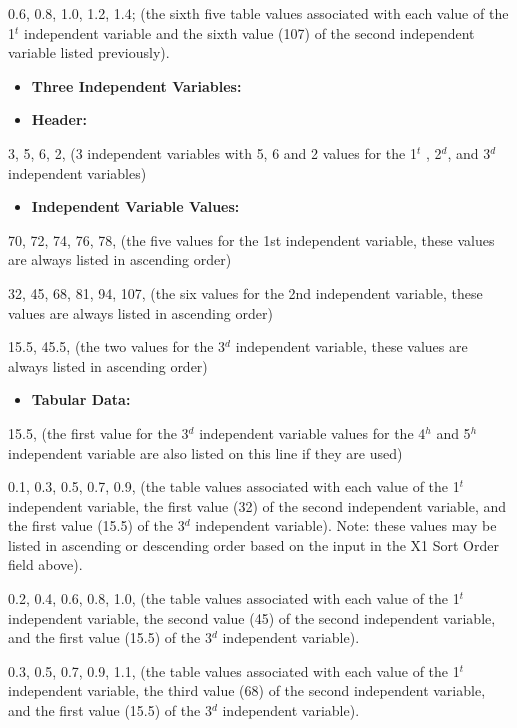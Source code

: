 0.6, 0.8, 1.0, 1.2, 1.4; (the sixth five table values associated with each value of the 1\(^{t}\) independent variable and the sixth value (107) of the second independent variable listed previously).

\begin{itemize}
\item
  \textbf{Three Independent Variables:}
\item
  \textbf{Header:}
\end{itemize}

3, 5, 6, 2, (3 independent variables with 5, 6 and 2 values for the 1\(^{t}\) , 2\(^{d}\), and 3\(^{d}\) independent variables)

\begin{itemize}
\tightlist
\item
  \textbf{Independent Variable Values:}
\end{itemize}

70, 72, 74, 76, 78, (the five values for the 1st independent variable, these values are always listed in ascending order)

32, 45, 68, 81, 94, 107, (the six values for the 2nd independent variable, these values are always listed in ascending order)

15.5, 45.5, (the two values for the 3\(^{d}\) independent variable, these values are always listed in ascending order)

\begin{itemize}
\tightlist
\item
  \textbf{Tabular Data:}
\end{itemize}

15.5, (the first value for the 3\(^{d}\) independent variable values for the 4\(^{h}\) and 5\(^{h}\) independent variable are also listed on this line if they are used)

0.1, 0.3, 0.5, 0.7, 0.9, (the table values associated with each value of the 1\(^{t}\) independent variable, the first value (32) of the second independent variable, and the first value (15.5) of the 3\(^{d}\) independent variable). Note: these values may be listed in ascending or descending order based on the input in the X1 Sort Order field above).

0.2, 0.4, 0.6, 0.8, 1.0, (the table values associated with each value of the 1\(^{t}\) independent variable, the second value (45) of the second independent variable, and the first value (15.5) of the 3\(^{d}\) independent variable).

0.3, 0.5, 0.7, 0.9, 1.1, (the table values associated with each value of the 1\(^{t}\) independent variable, the third value (68) of the second independent variable, and the first value (15.5) of the 3\(^{d}\) independent variable).

